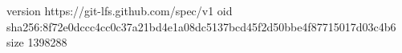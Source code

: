 version https://git-lfs.github.com/spec/v1
oid sha256:8f72e0dccc4cc0c37a21bd4e1a08dc5137bcd45f2d50bbe4f87715017d03c4b6
size 1398288
